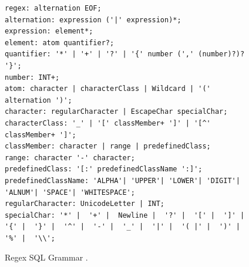 \begin{figure}[H]
\begin{verbatim}
regex: alternation EOF;
alternation: expression ('|' expression)*;
expression: element*;
element: atom quantifier?;
quantifier: '*' | '+' | '?' | '{' number (',' (number)?)? '}';
number: INT+;
atom: character | characterClass | Wildcard | '(' alternation ')';
character: regularCharacter | EscapeChar specialChar;
characterClass: '_' | '[' classMember+ ']' | '[^' classMember+ ']';
classMember: character | range | predefinedClass;
range: character '-' character;
predefinedClass: '[:' predefinedClassName ':]';
predefinedClassName: 'ALPHA'| 'UPPER'| 'LOWER'| 'DIGIT'| 'ALNUM'| 'SPACE'| 'WHITESPACE';
regularCharacter: UnicodeLetter | INT;
specialChar: '*' |  '+' |  Newline |  '?' |  '[' |  ']' |  '{' |  '}' |  '^' |  '-' |  '_' |  '|' |  '( |' |  ')' |  '%' |  '\\';
\end{verbatim}
\caption[Parser Grammar]{Regex SQL Grammar \cite{2022Firebird}.}\label{fig:zregexgrammar}
\end{figure}

